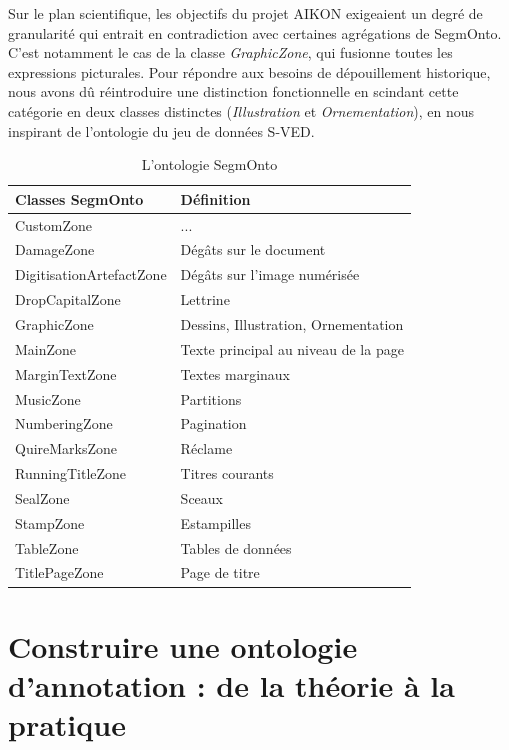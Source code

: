 Sur le plan scientifique, les objectifs du projet AIKON exigeaient un degré de granularité qui entrait en contradiction avec certaines agrégations de SegmOnto. C'est notamment le cas de la classe \textit{GraphicZone}, qui fusionne toutes les expressions picturales. Pour répondre aux besoins de dépouillement historique, nous avons dû réintroduire une distinction fonctionnelle en scindant cette catégorie en deux classes distinctes (\textit{Illustration} et \textit{Ornementation}), en nous inspirant de l'ontologie du jeu de données S-VED.

\begin{table}[h]
    \centering
    \caption{L'ontologie SegmOnto}
    \label{tab:segmonto}
    \begin{tabular}{l l}
        \toprule           
        \textbf{Classes SegmOnto} & \textbf{Définition} \\
        \midrule
        CustomZone & ... \\
        DamageZone & Dégâts sur le document \\
        DigitisationArtefactZone & Dégâts sur l'image numérisée \\
        DropCapitalZone & Lettrine \\
        GraphicZone & Dessins, Illustration, Ornementation \\
        MainZone & Texte principal au niveau de la page \\
        MarginTextZone & Textes marginaux \\
        MusicZone & Partitions \\
        NumberingZone & Pagination \\
        QuireMarksZone & Réclame \\
        RunningTitleZone & Titres courants \\
        SealZone & Sceaux \\
        StampZone & Estampilles \\
        TableZone & Tables de données \\
        TitlePageZone & Page de titre \\
        \bottomrule
    \end{tabular}
\end{table}

\section[Construire une ontologie d'annotation]{Construire une ontologie d'annotation : de la théorie à la pratique}

